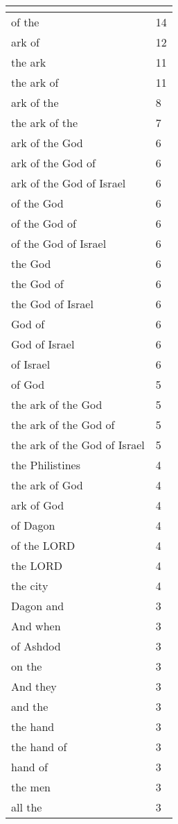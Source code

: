 \begin{center}
\begin{longtable}{|p{3.0in}|p{0.5in}|}
\hline \multicolumn{2}{c}{{ }} \\ \hline
\endfoot 
of the & 14\\ \hline 
ark of & 12\\ \hline 
the ark & 11\\ \hline 
the ark of & 11\\ \hline 
ark of the & 8\\ \hline 
the ark of the & 7\\ \hline 
ark of the God & 6\\ \hline 
ark of the God of & 6\\ \hline 
ark of the God of Israel & 6\\ \hline 
of the God & 6\\ \hline 
of the God of & 6\\ \hline 
of the God of Israel & 6\\ \hline 
the God & 6\\ \hline 
the God of & 6\\ \hline 
the God of Israel & 6\\ \hline 
God of & 6\\ \hline 
God of Israel & 6\\ \hline 
of Israel & 6\\ \hline 
of God & 5\\ \hline 
the ark of the God & 5\\ \hline 
the ark of the God of & 5\\ \hline 
the ark of the God of Israel & 5\\ \hline 
the Philistines & 4\\ \hline 
the ark of God & 4\\ \hline 
ark of God & 4\\ \hline 
of Dagon & 4\\ \hline 
of the LORD & 4\\ \hline 
the LORD & 4\\ \hline 
the city & 4\\ \hline 
Dagon and & 3\\ \hline 
And when & 3\\ \hline 
of Ashdod & 3\\ \hline 
on the & 3\\ \hline 
And they & 3\\ \hline 
and the & 3\\ \hline 
the hand & 3\\ \hline 
the hand of & 3\\ \hline 
hand of & 3\\ \hline 
the men & 3\\ \hline 
all the & 3\\ \hline 
\end{longtable}
\end{center}





